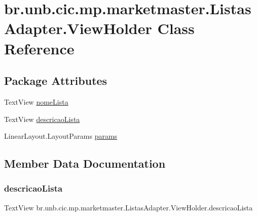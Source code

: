 \hypertarget{classbr_1_1unb_1_1cic_1_1mp_1_1marketmaster_1_1ListasAdapter_1_1ViewHolder}{}\section{br.\+unb.\+cic.\+mp.\+marketmaster.\+Listas\+Adapter.\+View\+Holder Class Reference}
\label{classbr_1_1unb_1_1cic_1_1mp_1_1marketmaster_1_1ListasAdapter_1_1ViewHolder}
\subsection*{Package Attributes}
\begin{DoxyCompactItemize}
\item 
Text\+View \mbox{\hyperlink{classbr_1_1unb_1_1cic_1_1mp_1_1marketmaster_1_1ListasAdapter_1_1ViewHolder_a9835c8d8adde4bdc7eb8eb9619e2302d}{nome\+Lista}}
\item 
Text\+View \mbox{\hyperlink{classbr_1_1unb_1_1cic_1_1mp_1_1marketmaster_1_1ListasAdapter_1_1ViewHolder_a04aaebff4550c482f98c6c6d644a2acb}{descricao\+Lista}}
\item 
Linear\+Layout.\+Layout\+Params \mbox{\hyperlink{classbr_1_1unb_1_1cic_1_1mp_1_1marketmaster_1_1ListasAdapter_1_1ViewHolder_a418c079438b872132835ab4d891d3a11}{params}}
\end{DoxyCompactItemize}


\subsection{Member Data Documentation}
\mbox{\label{classbr_1_1unb_1_1cic_1_1mp_1_1marketmaster_1_1ListasAdapter_1_1ViewHolder_a04aaebff4550c482f98c6c6d644a2acb}} 
\subsubsection{\texorpdfstring{descricao\+Lista}{descricaoLista}}
{\footnotesize\ttfamily Text\+View br.\+unb.\+cic.\+mp.\+marketmaster.\+Listas\+Adapter.\+View\+Holder.\+descricao\+Lista\hspace{0.3cm}{\ttfamily [package]}}

